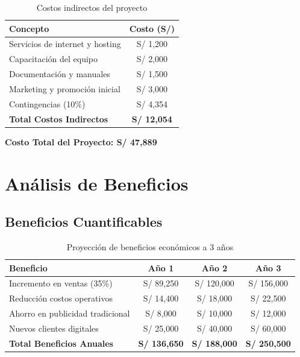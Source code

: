 \documentclass[12pt,a4paper]{report}
\begin{document}
\begin{table}[ht]
	\centering
	\begin{tabular}{lc}
		\toprule
		\rowcolor{orange!30}
		\textbf{Concepto}                & \textbf{Costo (S/)} \\
		\midrule
		Servicios de internet y hosting  & S/ 1,200            \\
		Capacitación del equipo          & S/ 2,000            \\
		Documentación y manuales         & S/ 1,500            \\
		Marketing y promoción inicial    & S/ 3,000            \\
		Contingencias (10\%)             & S/ 4,354            \\
		\midrule
		\rowcolor{orange!20}
		\textbf{Total Costos Indirectos} & \textbf{S/ 12,054}  \\
		\bottomrule
	\end{tabular}
	\caption{Costos indirectos del proyecto}
\end{table}

\textbf{Costo Total del Proyecto: S/ 47,889}

\section{Análisis de Beneficios}

\subsection{Beneficios Cuantificables}

\begin{table}[ht]
	\centering
	\begin{tabular}{lccc}
		\toprule
		\rowcolor{orange!30}
		\textbf{Beneficio}                & \textbf{Año 1}      & \textbf{Año 2}      & \textbf{Año 3}      \\
		\midrule
		Incremento en ventas (35\%)       & S/ 89,250           & S/ 120,000          & S/ 156,000          \\
		Reducción costos operativos       & S/ 14,400           & S/ 18,000           & S/ 22,500           \\
		Ahorro en publicidad tradicional  & S/ 8,000            & S/ 10,000           & S/ 12,000           \\
		Nuevos clientes digitales         & S/ 25,000           & S/ 40,000           & S/ 60,000           \\
		\midrule
		\rowcolor{orange!20}
		\textbf{Total Beneficios Anuales} & \textbf{S/ 136,650} & \textbf{S/ 188,000} & \textbf{S/ 250,500} \\
		\bottomrule
	\end{tabular}
	\caption{Proyección de beneficios económicos a 3 años}
\end{table}
\end{document}
